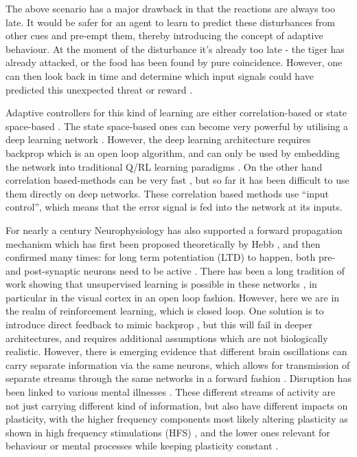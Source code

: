 \documentclass[Afour,sageh,times]{sagej}
\begin{document}
The above scenario has a major drawback in that the reactions are
always too late. It would be safer for an agent to learn to predict
these disturbances from other cues and pre-empt them, thereby
introducing the concept of adaptive behaviour. At the moment of the
disturbance it's already too late - the tiger has already attacked, or
the food has been found by pure coincidence. However, one can then
look back in time and determine which input signals could have
predicted this unexpected threat or reward
\cite{Sutton87,Sutton98,Abbott01,PorrNecoInvco2003}.

Adaptive controllers for this kind of learning are either
correlation-based \cite{Klopf86,PorrNecoISO2003,Verschure91} or state
space-based \cite{Dayan1992,Sutton98}. The state space-based ones can
become very powerful by utilising a deep learning network
\cite{Guo2014}. However, the deep learning architecture requires backprop which
is an open loop algorithm, and can only be used by embedding the
network into traditional Q/RL learning
paradigms \cite{Dayan1992,Guo2014}. On the other hand correlation
based-methods can be very fast \cite{Porr2006ICO}, but so far it has
been difficult to use them directly on deep networks. These
correlation based methods use ``input control'', which means that the
error signal is fed into the network at its inputs.

For nearly a century Neurophysiology has also supported a forward
propagation mechanism which has first been proposed theoretically by
Hebb \cite{Hebb49}, and then confirmed many times: for long term
potentiation (LTD) to happen, both pre- and post-synaptic neurons need
to be active \cite{Luescher2012}. There has been a long tradition of
work showing that unsupervised learning is possible in these networks
\cite{Linsker88}, in particular in the visual cortex \cite{Miller00}
in an open loop fashion. However, here we are in the realm of
reinforcement learning, which is closed loop. One solution is to
introduce direct feedback to mimic backprop \cite{Lillicrap2016}, but
this will fail in deeper architectures, and requires additional
assumptions which are not biologically realistic. However, there is
emerging evidence that different brain oscillations can carry separate
information via the same neurons, which allows for transmission of separate
streams through the same networks in a forward fashion
\cite{Mizuhara2007,Canolty2010}. Disruption has been linked to
various mental illnesses \cite{Kim2016,Won2017}. These different
streams of activity are not just carrying different kind of
information, but also have different impacts on plasticity, with the
higher frequency components most likely altering plasticity as shown
in high frequency stimulations (HFS) \cite{Bliss73}, and the lower
ones relevant for behaviour or mental processes while keeping
plasticity constant \cite{Mizuhara2007}.
\end{document}
